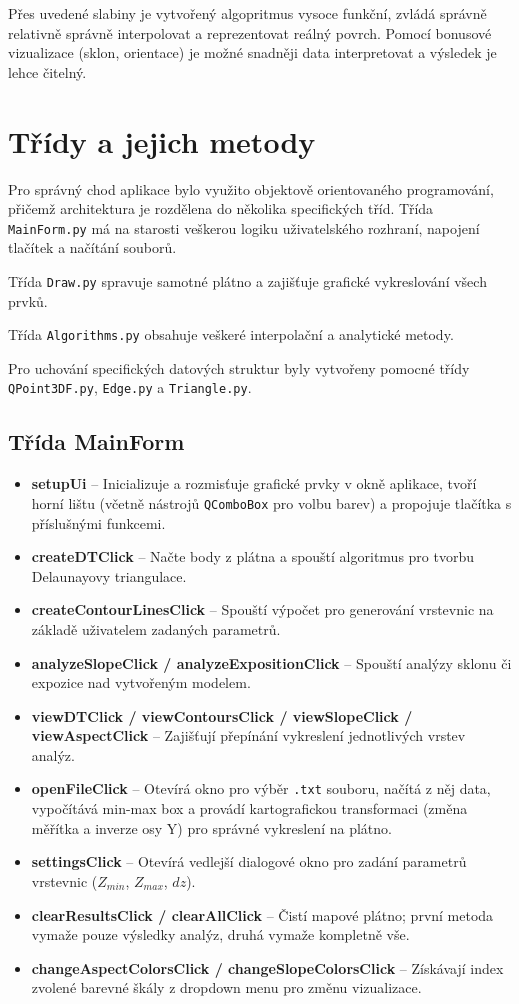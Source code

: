 \documentclass[12pt, a4paper]{article}
\begin{document}
\newpage

Přes uvedené slabiny je vytvořený algopritmus vysoce funkční, zvládá správně relativně správně interpolovat a reprezentovat reálný povrch. Pomocí bonusové vizualizace (sklon, orientace) je možné snadněji data interpretovat a výsledek je lehce čitelný.

\section{Třídy a jejich metody}
Pro správný chod aplikace bylo využito objektově orientovaného programování, přičemž architektura je rozdělena do několika specifických tříd. Třída \texttt{MainForm.py} má na starosti veškerou logiku uživatelského rozhraní, napojení tlačítek a načítání souborů. 

Třída \texttt{Draw.py} spravuje samotné plátno a zajišťuje grafické vykreslování všech prvků. 

Třída \texttt{Algorithms.py} obsahuje veškeré interpolační a analytické metody. 

Pro uchování specifických datových struktur byly vytvořeny pomocné třídy \texttt{QPoint3DF.py}, \texttt{Edge.py} a \texttt{Triangle.py}.


\subsection{Třída MainForm}
\begin{itemize}
    \item \textbf{setupUi} – Inicializuje a rozmisťuje grafické prvky v okně aplikace, tvoří horní lištu (včetně nástrojů \texttt{QComboBox} pro volbu barev) a propojuje tlačítka s příslušnými funkcemi.
    \item \textbf{createDTClick} – Načte body z plátna a spouští algoritmus pro tvorbu Delaunayovy triangulace.
    \item \textbf{createContourLinesClick} – Spouští výpočet pro generování vrstevnic na základě uživatelem zadaných parametrů.
    \item \textbf{analyzeSlopeClick / analyzeExpositionClick} – Spouští analýzy sklonu či expozice nad vytvořeným modelem.
    \item \textbf{viewDTClick / viewContoursClick / viewSlopeClick / viewAspectClick} – Zajišťují přepínání vykreslení jednotlivých vrstev analýz.
    \item \textbf{openFileClick} – Otevírá okno pro výběr \texttt{.txt} souboru, načítá z něj data, vypočítává min-max box a provádí kartografickou transformaci (změna měřítka a inverze osy Y) pro správné vykreslení na plátno.
    \item \textbf{settingsClick} – Otevírá vedlejší dialogové okno pro zadání parametrů vrstevnic ($Z_{min}$, $Z_{max}$, $dz$).
    \item \textbf{clearResultsClick / clearAllClick} – Čistí mapové plátno; první metoda vymaže pouze výsledky analýz, druhá vymaže kompletně vše.
    \item \textbf{changeAspectColorsClick / changeSlopeColorsClick} – Získávají index zvolené barevné škály z dropdown menu pro změnu vizualizace.
\end{itemize}
\end{document}
